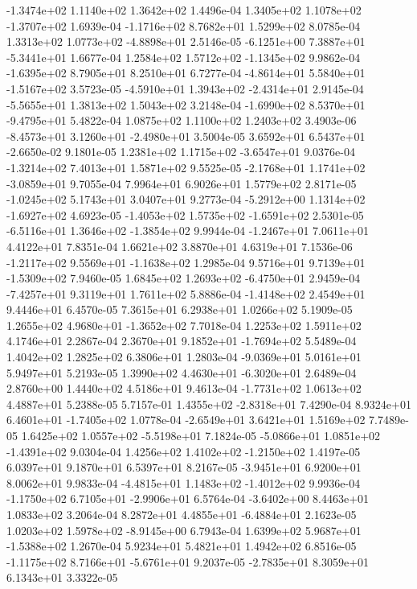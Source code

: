 -1.3474e+02  1.1140e+02  1.3642e+02  1.4496e-04
 1.3405e+02  1.1078e+02 -1.3707e+02  1.6939e-04
-1.1716e+02  8.7682e+01  1.5299e+02  8.0785e-04
 1.3313e+02  1.0773e+02 -4.8898e+01  2.5146e-05
-6.1251e+00  7.3887e+01 -5.3441e+01  1.6677e-04
 1.2584e+02  1.5712e+02 -1.1345e+02  9.9862e-04
-1.6395e+02  8.7905e+01  8.2510e+01  6.7277e-04
-4.8614e+01  5.5840e+01 -1.5167e+02  3.5723e-05
-4.5910e+01  1.3943e+02 -2.4314e+01  2.9145e-04
-5.5655e+01  1.3813e+02  1.5043e+02  3.2148e-04
-1.6990e+02  8.5370e+01 -9.4795e+01  5.4822e-04
1.0875e+02 1.1100e+02 1.2403e+02  3.4903e-06
-8.4573e+01  3.1260e+01 -2.4980e+01  3.5004e-05
 3.6592e+01  6.5437e+01 -2.6650e-02  9.1801e-05
 1.2381e+02  1.1715e+02 -3.6547e+01  9.0376e-04
-1.3214e+02  7.4013e+01  1.5871e+02  9.5525e-05
-2.1768e+01  1.1741e+02 -3.0859e+01  9.7055e-04
7.9964e+01 6.9026e+01 1.5779e+02  2.8171e-05
-1.0245e+02  5.1743e+01  3.0407e+01  9.2773e-04
-5.2912e+00  1.1314e+02 -1.6927e+02  4.6923e-05
-1.4053e+02  1.5735e+02 -1.6591e+02  2.5301e-05
-6.5116e+01  1.3646e+02 -1.3854e+02  9.9944e-04
-1.2467e+01  7.0611e+01  4.4122e+01  7.8351e-04
1.6621e+02 3.8870e+01 4.6319e+01  7.1536e-06
-1.2117e+02  9.5569e+01 -1.1638e+02  1.2985e-04
 9.5716e+01  9.7139e+01 -1.5309e+02  7.9460e-05
 1.6845e+02  1.2693e+02 -6.4750e+01  2.9459e-04
-7.4257e+01  9.3119e+01  1.7611e+02  5.8886e-04
-1.4148e+02  2.4549e+01  9.4446e+01  6.4570e-05
7.3615e+01 6.2938e+01 1.0266e+02  5.1909e-05
 1.2655e+02  4.9680e+01 -1.3652e+02  7.7018e-04
1.2253e+02 1.5911e+02 4.1746e+01  2.2867e-04
 2.3670e+01  9.1852e+01 -1.7694e+02  5.5489e-04
1.4042e+02 1.2825e+02 6.3806e+01  1.2803e-04
-9.0369e+01  5.0161e+01  5.9497e+01  5.2193e-05
 1.3990e+02  4.4630e+01 -6.3020e+01  2.6489e-04
2.8760e+00 1.4440e+02 4.5186e+01  9.4613e-04
-1.7731e+02  1.0613e+02  4.4887e+01  5.2388e-05
 5.7157e-01  1.4355e+02 -2.8318e+01  7.4290e-04
 8.9324e+01  6.4601e+01 -1.7405e+02  1.0778e-04
-2.6549e+01  3.6421e+01  1.5169e+02  7.7489e-05
 1.6425e+02  1.0557e+02 -5.5198e+01  7.1824e-05
-5.0866e+01  1.0851e+02 -1.4391e+02  9.0304e-04
 1.4256e+02  1.4102e+02 -1.2150e+02  1.4197e-05
6.0397e+01 9.1870e+01 6.5397e+01  8.2167e-05
-3.9451e+01  6.9200e+01  8.0062e+01  9.9833e-04
-4.4815e+01  1.1483e+02 -1.4012e+02  9.9936e-04
-1.1750e+02  6.7105e+01 -2.9906e+01  6.5764e-04
-3.6402e+00  8.4463e+01  1.0833e+02  3.2064e-04
 8.2872e+01  4.4855e+01 -6.4884e+01  2.1623e-05
 1.0203e+02  1.5978e+02 -8.9145e+00  6.7943e-04
 1.6399e+02  5.9687e+01 -1.5388e+02  1.2670e-04
5.9234e+01 5.4821e+01 1.4942e+02  6.8516e-05
-1.1175e+02  8.7166e+01 -5.6761e+01  9.2037e-05
-2.7835e+01  8.3059e+01  6.1343e+01  3.3322e-05
